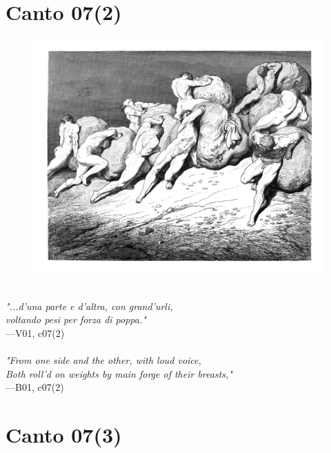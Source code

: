 \documentclass[../Dore_vision.tex]{subfiles}
\begin{document}
\newpage

\section{Canto 07(2)}

\begin{figure}[ht]
\centering
\includegraphics[height=\figsize]{illustrations/book_1/V01, c07(2).jpg}
\end{figure}

\begin{center}
\begin{minipage}{0.8\linewidth}
\textit{\\
"...d’una parte e d’altra, con grand’urli,\\voltando pesi per forza di poppa."} \\
—V01, c07(2) \\~\\
\textit{"From one side and the other, with loud voice,\\Both roll'd on weights by main forge of their breasts,"} \\
—B01, c07(2)
\end{minipage}
\end{center}

\newpage

\section{Canto 07(3)}
\end{document}
